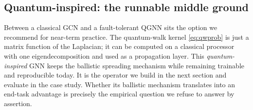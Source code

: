 \subsection{Quantum-inspired: the runnable middle ground}
Between a classical GCN and a fault-tolerant QGNN sits the option we recommend for
near-term practice. The quantum-walk kernel \eqref{eq:qwprob} is just a matrix
function of the Laplacian; it can be computed on a classical processor with one
eigendecomposition and used as a propagation layer. This \emph{quantum-inspired}
GNN keeps the ballistic spreading mechanism while remaining trainable and
reproducible today. It is the operator we build in the next section and evaluate in
the case study. Whether its ballistic mechanism translates into an end-task advantage
is precisely the empirical question we refuse to answer by assertion.
